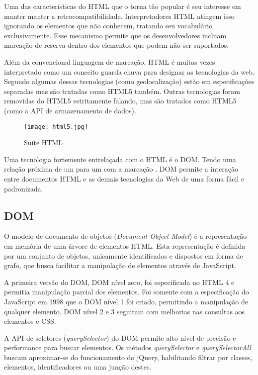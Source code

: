 Uma das características do HTML que o torna tão popular é seu
interesse em manter manter a retrocompatibilidade. Interpretadores
HTML atingem isso ignorando os elementos que não conhecem, tratando
seu vocabulário exclusivamente. Esse mecanismo permite que os
desenvolvedores incluam marcação de reserva dentro dos elementos
que podem não ser suportados.

Além da convencional linguagem de marcação, HTML é muitas vezes
interpretado como um conceito guarda chuva para designar as tecnologias
da web. Segundo \citet{diveIntohtml} algumas dessas tecnologias (como
geolocalização) estão em especificações separadas mas são
tratadas como HTML5 também. Outras tecnologias foram removidas do
HTML5 estritamente falando, mas são tratados como HTML5 (como a API de
armazenamento de dados).

\begin{figure}[H]
    \centering
    \texttt{[image: html5.jpg]}
    \caption{Suíte HTML}
\end{figure}

Uma tecnologia fortemente entrelaçada com o HTML é o DOM.
Tendo uma relação próxima de um para um com a marcação
\autocite{howBrowsersWork}. DOM permite a interação entre documentos
HTML e as demais tecnologias da Web de uma forma fácil e padronizada.

\subsection{DOM}

O modelo de documento de objetos (\textit{Document Object Model}) é
a representação em memória de uma árvore de elementos HTML. Esta
representação é definida por um conjunto de objetos, unicamente
identificados e dispostos em forma de grafo, que busca facilitar a
manipulação de elementos através de JavaScript.

A primeira versão do DOM, DOM nível zero, foi especificada no
HTML 4 e permitia manipulação parcial dos elementos. Foi somente
com a especificação do JavaScript em 1998 que o DOM nível 1 foi
criado, permitindo a manipulação de qualquer elemento. DOM
nível 2 e 3 seguiram com melhorias nas consultas aos elementos e CSS.

A API de seletores (\textit{querySelector}) do DOM permite alto
nível de precisão e performance para buscar elementos. Os métodos
\textit{querySelector} e \textit{querySelectorAll} buscam aproximar-se
do funcionamento do jQuery, habilitando filtrar por classes, elementos,
identificadores ou uma junção destes.

